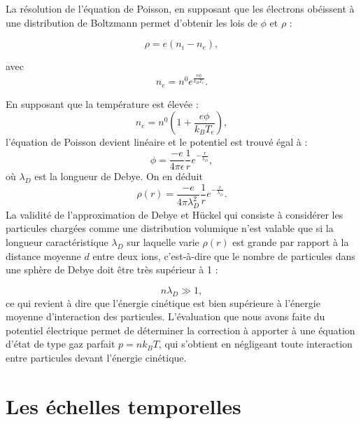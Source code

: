 \documentclass{book}
\begin{document}
La r\'esolution de l'\'equation de Poisson, en supposant que les
\'electrons 
ob\'eissent \`a une distribution de 
Boltzmann permet d'obtenir les lois de
$\phi$ et $\rho$ : 

\begin{equation}
\rho=e(n_i- n_e),
\end{equation}

avec 
\begin{equation}
n_e=n^0e^{\frac{e\phi}{k_B T_e}}.
\end{equation}

En supposant que la temp\'erature est \'elev\'ee :
\begin{equation}
n_e=n^0(1+\frac{e\phi}{k_B T_e}),
\end{equation}
l'\'equation de Poisson devient lin\'eaire et le potentiel est trouv\'e \'egal
\`a :
\begin{equation}
\phi=\frac{-e}{4\pi\epsilon}\frac{1}{r}e^{-\frac{r}{\lambda_D}},
\end{equation}
o\`u $\lambda_D$ est la longueur de Debye. On en d\'eduit 
\begin{equation}
\rho(r)=\frac{-e}{4\pi\lambda_D^2}\frac{1}{r}e^{-\frac{r}{\lambda_D}}.
\end{equation}
La validit\'e de l'approximation de Debye et H\"uckel qui consiste \`a
consid\'erer les particules charg\'ees comme une distribution volumique
n'est valable que si la longueur caract\'eristique  $\lambda_D$ sur
laquelle varie $\rho(r)$ est grande par rapport \`a la distance
moyenne $d$ 
entre deux ions, c'est-\`a-dire que le nombre de particules dans une
sph\`ere de Debye doit \^etre tr\`es sup\'erieur \`a 1 :

\begin{equation}
n\lambda_D\gg 1,
\end{equation}
ce qui revient \`a dire que l'\'energie cin\'etique est bien
sup\'erieure \`a 
l'\'energie moyenne d'interaction des particules.
L'\'evaluation que nous avons faite du potentiel \'electrique permet de
d\'eterminer la correction \`a apporter \`a une \'equation d'\'etat de
type gaz 
parfait
$p=nk_BT$, qui s'obtient en n\'egligeant toute interaction entre
particules devant l'\'energie cin\'etique.



\section{Les \'echelles temporelles}
\end{document}
